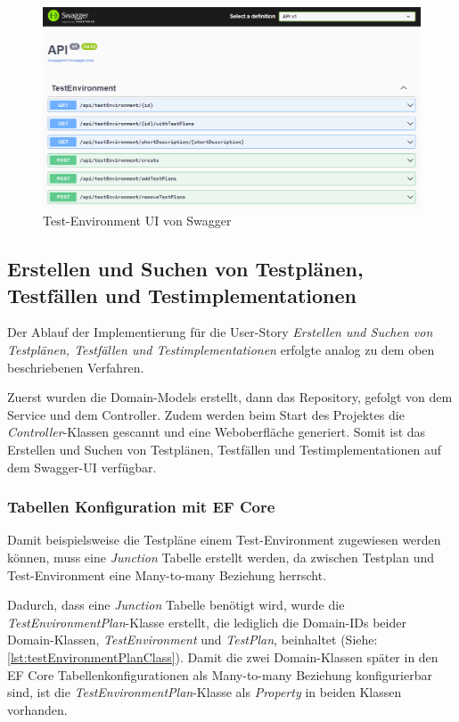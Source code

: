 \documentclass[a4paper, fontsize=11pt, parskip=half, twoside, headings=openright]{scrreprt}
\begin{document}
	\begin{figure}[ht]
		\centering
		\includegraphics[scale=0.5]{assets/swaggerui_testenvironment.png}
		\caption{Test-Environment \ac{UI} von Swagger}
		\label{fig:swaggeruiTestenvironment}
	\end{figure}
	
	\subsection{Erstellen und Suchen von Testplänen, Testfällen und Testimplementationen} \label{subsec:createAndSearchTestplans}
	Der Ablauf der Implementierung für die User-Story \emph{Erstellen und Suchen von Testplänen, Testfällen und Testimplementationen} erfolgte analog zu dem oben beschriebenen Verfahren.
	
	Zuerst wurden die Domain-Models erstellt, dann das Repository, gefolgt von dem Service und dem Controller.
	Zudem werden beim Start des Projektes die \emph{Controller}-Klassen gescannt und eine Weboberfläche generiert.
	Somit ist das Erstellen und Suchen von Testplänen, Testfällen und Testimplementationen auf dem Swagger-UI verfügbar. 
	
	\subsubsection{Tabellen Konfiguration mit EF Core}
	Damit beispielsweise die Testpläne einem Test-Environment zugewiesen werden können, muss eine \emph{Junction} Tabelle erstellt werden, da zwischen Testplan und Test-Environment eine Many-to-many Beziehung herrscht.
	
	Dadurch, dass eine \emph{Junction} Tabelle benötigt wird, wurde die \emph{TestEnvironmentPlan}-Klasse erstellt, die lediglich die Domain-\ac{ID}s beider Domain-Klassen, \emph{TestEnvironment} und \emph{TestPlan}, beinhaltet (Siehe: \autoref{lst:testEnvironmentPlanClass}). 
	Damit die zwei Domain-Klassen später in den \ac{EF} Core Tabellenkonfigurationen als Many-to-many Beziehung konfigurierbar sind, ist die \emph{TestEnvironmentPlan}-Klasse als \emph{Property} in beiden Klassen vorhanden.
	
\end{document}
